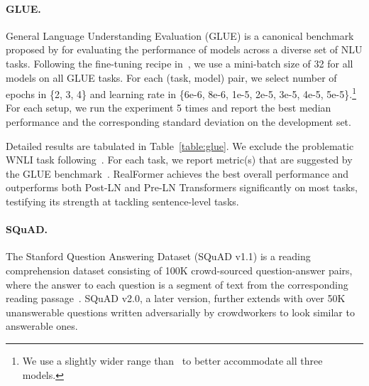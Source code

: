 \documentclass[11pt,a4paper]{article}
\begin{document}
\paragraph{GLUE.}
General Language Understanding Evaluation (GLUE) is a canonical benchmark proposed by \citet{Wang-2018-glue} for evaluating the performance of models across a diverse set of NLU tasks. Following the fine-tuning recipe in~\citet{Devlin-2019-bert}, we use a mini-batch size of 32 for all models on all GLUE tasks. For each (task, model) pair, we select number of epochs in \{2, 3, 4\} and learning rate in \{6e-6, 8e-6, 1e-5, 2e-5, 3e-5, 4e-5, 5e-5\}.\footnote{We use a slightly wider range than~\citet{Devlin-2019-bert} to better accommodate all three models.} For each setup, we run the experiment 5 times and report the best median performance and the corresponding standard deviation on the development set.



Detailed results are tabulated in Table~\ref{table:glue}. We exclude the problematic WNLI task following~\citet{Devlin-2019-bert}. For each task, we report metric(s) that are suggested by the GLUE benchmark~\citep{Wang-2018-glue}. RealFormer achieves the best overall performance and outperforms both Post-LN and Pre-LN Transformers significantly on most tasks, testifying its strength at tackling sentence-level tasks.



\paragraph{SQuAD.}
The Stanford Question Answering Dataset (SQuAD v1.1) is a reading comprehension dataset consisting of 100K crowd-sourced question-answer pairs, where the answer to each question is a segment of text from the corresponding reading passage~\citep{Rajpurkar-2016-squad}.
SQuAD v2.0, a later version, further extends with over 50K unanswerable questions written adversarially by crowdworkers to look similar to answerable ones.
\end{document}
